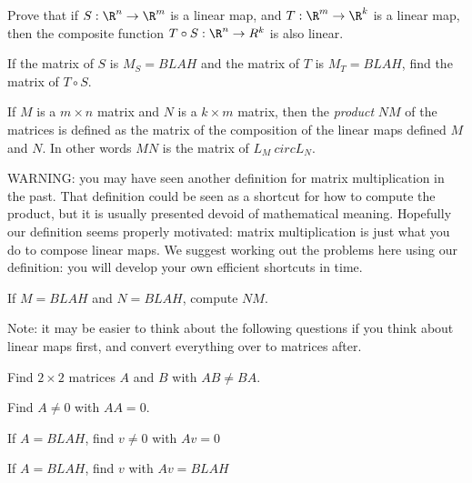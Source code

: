 	\begin{question}
		Prove that if $S:\R^n \to \R^m$ is a linear map, and $T:\R^m \to \R^k$ is a linear map, then the composite function $T\circ S:\R^n \to R^k$ is also linear.
	\end{question}
	
	\begin{question}
		If the matrix of $S$ is $M_S = BLAH$ and the matrix of $T$ is $M_T = BLAH$, find the matrix of $T \circ S$.
	\end{question}
	
	
	\begin{definition}
		If $M$ is a $m\times n$ matrix and $N$ is a $k \times m$ matrix, then the \textit{product} $NM$ of the matrices is
		defined as the matrix of the composition of the linear maps defined $M$ and $N$.  In other words  $MN$ is the matrix of 
		$L_M\ circ L_N$.
	\end{definition}
	
	WARNING:  you may have seen another definition for matrix multiplication in the past.  That definition could be seen as a shortcut for how
	to compute the product, but it is usually presented devoid of mathematical meaning.  Hopefully our definition seems properly motivated:  matrix multiplication is 
	just what you do to compose linear maps.  We suggest working out the problems here using our definition:  you will develop your own efficient shortcuts in time.
	
	\begin{question}
		If $M = BLAH$ and $N=BLAH$, compute $NM$.
	\end{question}
	
	Note:  it may be easier to think about the following questions if you think about linear maps first, and convert everything over to matrices after.
	
	\begin{question}
		Find $2\times 2$ matrices $A$ and $B$ with $AB \neq BA$.
	\end{question}
	
	\begin{question}
		Find $A \neq 0$  with $AA = 0$.
	\end{question}
	
	\begin{question}
		If $A = BLAH$, find $v \neq 0$ with $Av = 0$ 
	\end{question}
	
	\begin{question}
		If $A = BLAH$, find $v$ with $Av = BLAH$ 
	\end{question}
	
